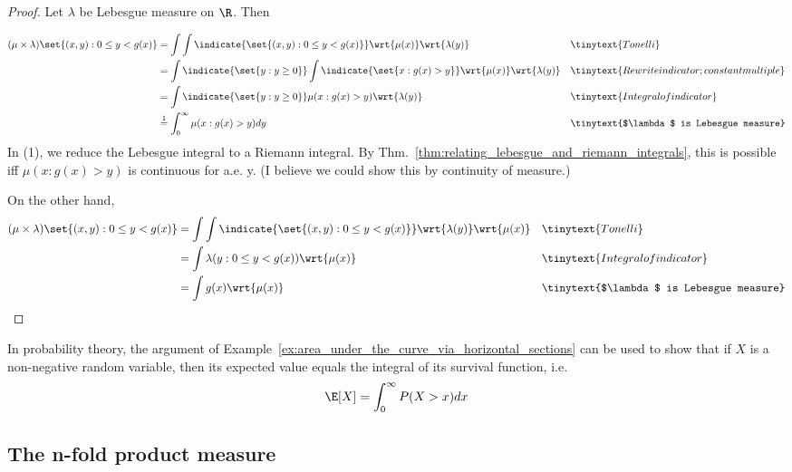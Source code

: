 \documentclass{article} %
\begin{document}
\begin{proof}
Let $\lambda$ be Lebesgue measure on $\R$.  Then 

\begin{align*}
(\mu \times \lambda)\set{(x,y): 0 \leq y < g(x)} &= \int \int \indicate{\set{(x,y): 0 \leq y < g(x)}} \wrt{\mu(x)} \wrt{\lambda(y)} && \tinytext{Tonelli} \\
&= \int \indicate{\set{y: y \geq 0}} \int \indicate{\set{x: g(x) >y}}  \wrt{\mu(x)} \wrt{\lambda(y)} && \tinytext{Rewrite indicator; constant multiple} \\
 &= \int \indicate{\set{y: y \geq 0}}  \mu(x: g(x) > y) \wrt{\lambda(y)} && \tinytext{Integral of indicator} \\
 & \stackrel{1}{=} \int_0^\infty \mu(x: g(x) > y) dy && \tinytext{$\lambda$ is Lebesgue measure} \\
\end{align*}
In (1), we reduce the Lebesgue integral to a Riemann integral. By Thm.~\ref{thm:relating_lebesgue_and_riemann_integrals}, this is possible iff $\mu(x: g(x) > y)$ is continuous for a.e. y. {\tiny (I believe we could show this by continuity of measure.)}   

On the other hand,
\begin{align*}
(\mu \times \lambda)\set{(x,y): 0 \leq y < g(x)} &= \int \int \indicate{\set{(x,y): 0 \leq y < g(x)}}  \wrt{\lambda(y)} \wrt{\mu(x)} && \tinytext{Tonelli} \\
 &= \int   \lambda(y: 0 \leq y < g(x)) \wrt{\mu(x)} && \tinytext{Integral of indicator} \\
&= \int   g(x) \wrt{\mu(x)} && \tinytext{$\lambda$ is Lebesgue measure} \\
\end{align*}	

\end{proof}


\begin{remark}
In probability theory, the argument of Example~\ref{ex:area_under_the_curve_via_horizontal_sections} can be used to show that if $X$ is a non-negative random variable, then its expected value equals the integral of its survival function, i.e. 
\[ \E[X] = \int_0^\infty P(X > x) dx \]
\end{remark}


\subsection{The n-fold product measure}
\end{document}
